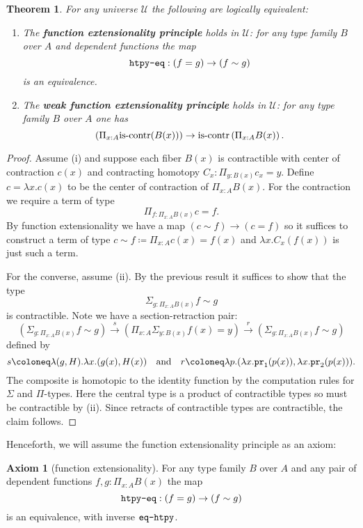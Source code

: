 \documentclass{amsart}
\theoremstyle{theorem}
\newtheorem*{thm}{Theorem}
\theoremstyle{definition}
\newtheorem*{ax}{Axiom}
\theoremstyle{remark}
\newcommand{\0}{\mathbbe{0}}
\newcommand{\1}{\mathbbe{1}}
\newcommand{\2}{\mathbbe{2}}
\newcommand{\3}{\mathbbe{3}}
\newcommand{\4}{\mathbbe{4}}
\newcommand{\term}[1]{{\textup{\texttt{#1}}}}
\newcommand{\type}[1]{{\textup{#1}}}
\newcommand{\pr}{\term{pr}}
\newcommand{\UU}{{\mathcal{U}}}
\newcommand{\is}[1]{\type{is-{#1}}}
\begin{document}
\begin{thm} For any universe $\UU$ the following are logically equivalent:
\begin{enumerate}
\item The \textbf{function extensionality principle} holds in $\UU$: for any type family $B$ over $A$ and dependent functions the map 
\[ \term{htpy-eq} : (f=g) \to (f \sim g)\]
is an equivalence.
\item The \textbf{weak function extensionality principle} holds in $\UU$:  for any type family $B$ over $A$ one has
\[ \left( \Pi_{x:A} \is{contr}(B(x)) \right) \to \is{contr}\left( \Pi_{x:A}B(x)\right).\]
\end{enumerate}
\end{thm}
\begin{proof}
Assume (i) and suppose each fiber $B(x)$ is contractible with center of contraction $c(x)$ and contracting homotopy $C_x : \Pi_{y : B(x)} c_x = y$. Define $c = \lambda x. c(x)$ to be the center of contraction of $\Pi_{x:A}B(x)$. For the contraction we require a term of type
\[ \Pi_{f : \Pi_{x : A}B(x)} c =f.\] By function extensionality we have a map $(c \sim f) \to (c=f)$ so it suffices to construct a term of type $c \sim f \coloneq \Pi_{x:A} c(x)= f(x)$ and $\lambda x. C_x(f(x))$ is just such a term.

For the converse, assume (ii). By the previous result it suffices to show that the type
\[ \Sigma_{g : \Pi_{x:A}B(x)} f \sim g\]
is contractible. Note we have a section-retraction pair:
\[ \left(\Sigma_{g : \Pi_{x:A}B(x)} f \sim g \right) \xrightarrow{s} \left( \Pi_{x:A}\Sigma_{y:B(x)} f(x) = y\right) \xrightarrow{r} 
\left(\Sigma_{g : \Pi_{x:A}B(x)} f \sim g \right) \]
defined by
\[ s \coloneq \lambda (g,H). \lambda x.(g(x),H(x)) \quad \text{and} \quad r \coloneq \lambda p. (\lambda x. \pr_1(p(x)), \lambda x. \pr_2(p(x))).\]
The composite is homotopic to the identity function by the computation rules for $\Sigma$ and $\Pi$-types. Here the central type is a product of contractible types so must be contractible by (ii). Since retracts of contractible types are contractible, the claim follows.
\end{proof}

Henceforth, we will assume the function extensionality principle as an axiom:

\begin{ax}[function extensionality] For any type family $B$ over $A$ and any pair of dependent functions $f,g : \Pi_{x:A}B(x)$ the map
\[ \term{htpy-eq} : (f=g) \to (f \sim g)\]
is an equivalence, with inverse $\term{eq-htpy}$.
\end{ax}
\end{document}
